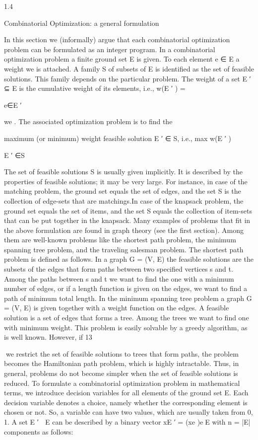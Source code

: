 \documentclass[titlepage]{book}
\begin{document}
1.4

Combinatorial Optimization: a general formulation

In this section we (informally) argue that each combinatorial optimization problem can be formulated
as an integer program. In a combinatorial optimization problem a finite ground set E is given. To each
element e ∈ E a weight we is attached. A family S of subsets of E is identified as the set of feasible
solutions. This family depends on the particular problem. The weight of a set E ′ ⊆ E is the cumulative
weight of its elements, i.e., w(E ′ ) =

e∈E ′

we . The associated optimization problem is to find the

maximum (or minimum) weight feasible solution E ′ ∈ S, i.e.,
max {w(E ′ )}

E ′ ∈S

The set of feasible solutions S is usually given implicitly. It is described by the properties of feasible
solutions; it may be very large. For instance, in case of the matching problem, the ground set equals
the set of edges, and the set S is the collection of edge-sets that are matchings.In case of the knapsack
problem, the ground set equals the set of items, and the set S equals the collection of item-sets that can
be put together in the knapsack.
Many examples of problems that fit in the above formulation are found in graph theory (see the first
section). Among them are well-known problems like the shortest path problem, the minimum spanning
tree problem, and the traveling salesman problem. The shortest path problem is defined as follows. In a
graph G = (V, E) the feasible solutions are the subsets of the edges that form paths between two specified
vertices s and t. Among the paths between s and t we want to find the one with a minimum number of
edges, or if a length function is given on the edges, we want to find a path of minimum total length. In
the minimum spanning tree problem a graph G = (V, E) is given together with a weight function on the
edges. A feasible solution is a set of edges that forms a tree. Among the trees we want to find one with
minimum weight. This problem is easily solvable by a greedy algorithm, as is well known. However, if
13

we restrict the set of feasible solutions to trees that form paths, the problem becomes the Hamiltonian
path problem, which is highly intractable. Thus, in general, problems do not become simpler when the
set of feasible solutions is reduced.
To formulate a combinatorial optimization problem in mathematical terms, we introduce decision variables for all elements of the ground set E. Each decision variable denotes a choice, namely whether the
corresponding element is chosen or not. So, a variable can have two values, which are usually taken from
{0, 1}. A set E ′ ⊆ E can be described by a binary vector xE ′ = (xe )e∈E with n = |E| components as
follows:
\end{document}
